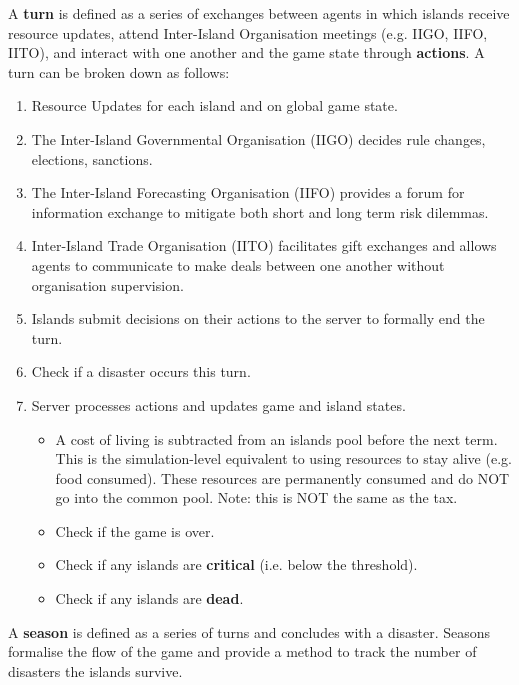 \begin{definition} \label{def:turn}
    A \textbf{turn} is defined as a series of exchanges between agents in which islands receive resource updates, attend Inter-Island Organisation meetings (e.g. IIGO, IIFO, IITO), and interact with one another and the game state through \textbf{actions}. A turn can be broken down as follows:
    \begin{enumerate}
        \item Resource Updates for each island and on global game state.
        \item The Inter-Island Governmental Organisation (IIGO) decides rule changes, elections, sanctions.
        \item The Inter-Island Forecasting Organisation (IIFO) provides a forum for information exchange to mitigate both short and long term risk dilemmas.
        \item Inter-Island Trade Organisation (IITO) facilitates gift exchanges and allows agents to communicate to make deals between one another without organisation supervision.
        \item Islands submit decisions on their actions to the server to formally end the turn.
        \item Check if a disaster occurs this turn.
        \item Server processes actions and updates game and island states.
            \begin{itemize}
                \item A cost of living is subtracted from an islands pool before the next term. This is the simulation-level equivalent to using resources to stay alive (e.g. food consumed). These resources are permanently consumed and do NOT go into the common pool. Note: this is NOT the same as the tax.
                \item Check if the game is over.
                \item Check if any islands are \textbf{critical} (i.e. below the threshold).
                \item Check if any islands are \textbf{dead}.
            \end{itemize}
    \end{enumerate}        
\end{definition}

\begin{definition} \label{def:gameseason}
    A \textbf{season} is defined as a series of turns and concludes with a disaster. Seasons formalise the flow of the game and provide a method to track the number of disasters the islands survive.
\end{definition}

